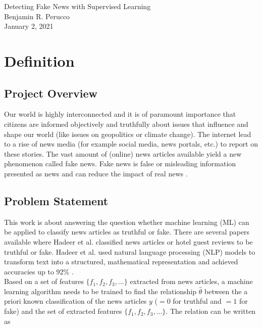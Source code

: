 \documentclass[a4paper,12pt,nottoc]{article}
\begin{document}
\begin{center}{\LARGE Detecting Fake News with Supervised Learning}\\\vspace{.5cm}Benjamin R. Perucco\\\vspace{.25cm}January 2, 2021\end{center}

\section{Definition}

\subsection{Project Overview}

Our world is highly interconnected and it is of paramount importance that citizens are informed objectively and truthfully about issues that influence and shape our world (like issues on geopolitics or climate change). The internet lead to a rise of news media (for example social media, news portals, etc.) to report on these stories. The vast amount of (online) news articles available yield a new phenomenon called fake news. Fake news is false or misleading information presented as news and can reduce the impact of real news \cite{bib:fakenews}. 

\subsection{Problem Statement}

This work is about answering the question whether machine learning (ML) can be applied to classify news articles as truthful or fake. There are several papers available where Hadeer et al. classified news articles \cite{bib:ahmed-2017} or hotel guest reviews \cite{bib:ahmed-2018} to be truthful or fake. Hadeer et al. used natural language processing (NLP) models to transform text into a structured, mathematical representation and achieved accuracies up to 92\% \cite{bib:ahmed-2017}.\\

\noindent Based on a set of features $\{f_{1}, f_{2}, f_{3}, ... \}$ extracted from news articles, a machine learning algorithm needs to be trained to find the relationship $\hat{\theta}$ between the a priori known classification of the news articles $y$ ($=0$ for truthful and $=1$ for fake) and the set of extracted features $\{f_{1}, f_{2}, f_{3}, ... \}$. The relation can be written as
\end{document}
